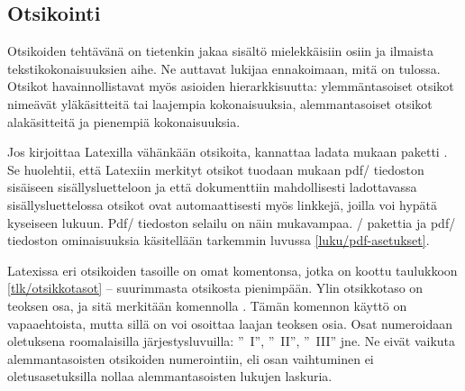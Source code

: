 \subsection{Otsikointi}
\label{luku/otsikot}

Otsikoiden tehtävänä on tietenkin jakaa sisältö mielekkäisiin osiin ja
ilmaista tekstikokonaisuuksien aihe. Ne auttavat lukijaa ennakoimaan,
mitä on tulossa. Otsikot havainnollistavat myös asioiden
hierarkkisuutta: ylemmäntasoiset otsikot nimeävät yläkäsitteitä tai
laajempia kokonaisuuksia, alemmantasoiset otsikot alakäsitteitä ja
pienempiä kokonaisuuksia.

Jos kirjoittaa Latexilla vähänkään otsikoita, kannattaa ladata mukaan
paketti . Se huolehtii, että Latexiin merkityt otsikot
tuodaan mukaan pdf\-/ tiedoston sisäiseen sisällysluetteloon ja että
dokumenttiin mahdollisesti ladottavassa sisällysluettelossa otsikot ovat
automaattisesti myös linkkejä, joilla voi hypätä kyseiseen lukuun.
Pdf\-/ tiedoston selailu on näin mukavampaa. \-/
pakettia ja pdf\-/ tiedoston ominaisuuksia käsitellään tarkemmin luvussa
\ref{luku/pdf-asetukset}.


Latexissa eri otsikoiden tasoille on omat komentonsa, jotka on koottu
taulukkoon \ref{tlk/otsikkotasot} -- suurimmasta otsikosta pienimpään.
Ylin otsikkotaso on teoksen osa, ja sitä merkitään komennolla
. Tämän komennon käyttö on vapaaehtoista, mutta sillä on
voi osoittaa laajan teoksen osia. Osat numeroidaan oletuksena
roomalaisilla järjestysluvuilla: ''\partname~I'', ''\partname~II'',
''\partname~III'' jne. Ne eivät vaikuta alemmantasoisten otsikoiden
numerointiin, eli osan vaihtuminen ei oletusasetuksilla nollaa
alemmantasoisten lukujen laskuria.

